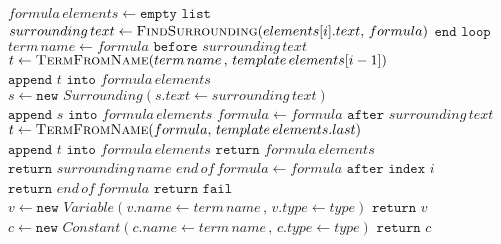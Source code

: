 \documentclass[../main.tex]{subfiles}
\begin{document}
\begin{algorithm}
\begin{algorithmic}[1]
    \State $formula \, elements \gets \texttt{empty list}$
            \State $surrounding \, text \gets \textsc{FindSurrounding}(elements[i].text, \,formula)$
                \State $\texttt{end loop}$
            \EndIf
            \State $ $
                \State $term \, name \gets formula \texttt{ before } surrounding \, text$
                \State $t \gets \textsc{TermFromName}(term \, name \, , \, template \, elements[i - 1])$
                \State $\texttt{append } t \texttt{ into } formula \, elements$
            \EndIf
            \State $ $
            \State $s \gets \texttt{new }Surrounding(s.text \gets surrounding \, text)$
            \State $\texttt{append } s \texttt{ into } formula \, elements$
            \State $formula \gets formula \texttt{ after } surrounding \, text$
        \EndIf
    \EndFor
    \State $ $
        \State $t \gets \textsc{TermFromName}(formula, \, template \, elements.last)$
        \State $\texttt{append } t \texttt{ into } formula \, elements$
    \EndIf
    \State $\texttt{return } formula \, elements$
    \State $ $
\EndProcedure
        \State $\texttt{return } surrounding \, name$
    \Else
            \State $end \, of \, formula \gets formula \texttt{ after index } i$
                \State $\texttt{return }end \, of \, formula$
            \EndIf
        \EndFor
    \EndIf
    \State $\texttt{return fail}$
    \State $ $
\EndProcedure
        \State $v \gets \texttt{new }Variable(v.name \gets term \, name \, ,\, v.type \gets type)$
        \State $ \texttt{return }v$
    \Else
        \State $c \gets \texttt{new }Constant(c.name \gets term \, name \, , \, c.type \gets type)$
        \State $\texttt{return }c$
    \EndIf
\EndProcedure
\end{algorithmic}
\end{algorithm}
\\
\\
\end{document}
